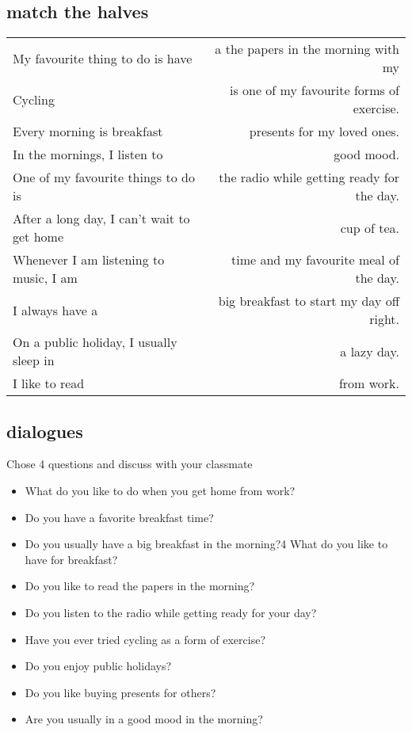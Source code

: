 \documentclass[]{article} %
\begin{document}
	
\subsection*{match the halves}
\begin{tabular}{l r}
My favourite thing to do is have & a the papers in the morning with my\\
Cycling & is one of my favourite forms of exercise.\\
Every morning is breakfast & presents for my loved ones.\\
In the mornings, I listen to & good mood.\\
One of my favourite things to do is & the radio while getting ready for the day.\\
After a long day, I can't wait to get home & cup of tea.\\
Whenever I am listening to music, I am & time and my favourite meal of the day.\\
I always have a & big breakfast to start my day off right.\\
On a public holiday, I usually sleep in & a lazy day.\\
I like to read & from work.\\
\end{tabular}

\subsection{dialogues}
	Chose 4 questions and discuss with your classmate
	\begin{itemize}
		\item 	What do you like to do when you get home from work?\\
		\item 	Do you have a favorite breakfast time?\\
		\item 	Do you usually have a big breakfast in the morning?4 What do you like to have for breakfast?\\
		\item Do you like to read the papers in the morning?\\
		\item Do you listen to the radio while getting ready for your day?\\
		\item Have you ever tried cycling as a form of exercise?\\
		\item Do you enjoy public holidays?\\
		\item Do you like buying presents for others?\\
		\item Are you usually in a good mood in the morning?\\
	\end{itemize}
\end{document}
